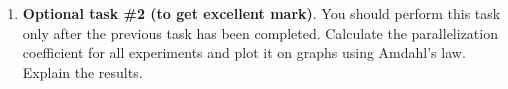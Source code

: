 {\begin{enumerate}
		\item\textbf{Optional task \#2 (to get excellent mark)}. You should perform this task only after the previous task has been completed. Calculate the parallelization coefficient for all experiments and plot it on graphs using Amdahl's law. Explain the results.
	\end{enumerate}
}